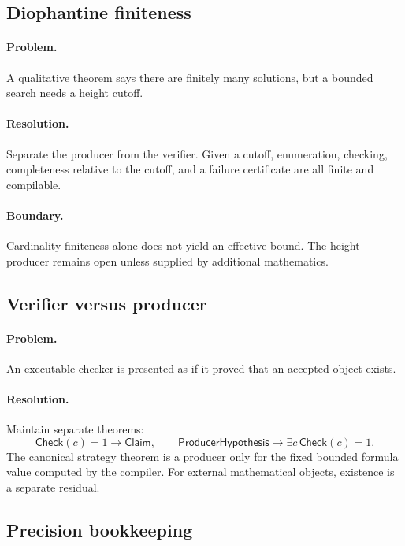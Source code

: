 \subsection{Diophantine finiteness}

\paragraph{Problem.}
A qualitative theorem says there are finitely many solutions, but a bounded
search needs a height cutoff.

\paragraph{Resolution.}
Separate the producer from the verifier.  Given a cutoff, enumeration,
checking, completeness relative to the cutoff, and a failure certificate are
all finite and compilable.

\paragraph{Boundary.}
Cardinality finiteness alone does not yield an effective bound.  The height
producer remains open unless supplied by additional mathematics.

\subsection{Verifier versus producer}

\paragraph{Problem.}
An executable checker is presented as if it proved that an accepted object
exists.

\paragraph{Resolution.}
Maintain separate theorems:
\[
 \mathsf{Check}(c)=1\to\mathsf{Claim},
 \qquad
 \mathsf{ProducerHypothesis}\to\exists c\,\mathsf{Check}(c)=1.
\]
The canonical strategy theorem is a producer only for the fixed bounded
formula value computed by the compiler.  For external mathematical objects,
existence is a separate residual.

\subsection{Precision bookkeeping}

